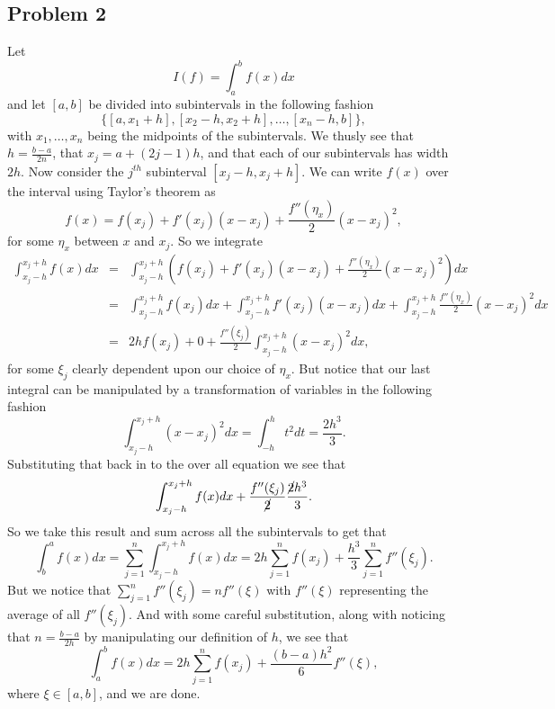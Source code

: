 \documentclass[12pt]{amsart}
\begin{document}
\begin{onehalfspace}
        \section{Problem 2}
        Let
        \[
            I(f) = \int_a^b f(x)dx
        \]
        and let $[a,b]$ be divided into subintervals in the following fashion
        \[
            \big\{[a,x_1+h],[x_2-h,x_2+h],\ldots,[x_n-h,b]\big\},
        \]
        with $x_1,\ldots,x_n$ being the midpoints of the subintervals.
        We thusly see that $h=\frac{b-a}{2n}$, that $x_j=a + (2j-1)h$, and that each of our subintervals has
        width $2h$.
        Now consider the $j^{th}$ subinterval $[x_j-h,x_j+h]$.
        We can write $f(x)$ over the interval using Taylor's theorem as
        \[
            f(x) = f(x_j) + f'(x_j)(x-x_j) + \frac{f''(\eta_x)}{2}(x-x_j)^2,
        \]
        for some $\eta_x$ between $x$ and $x_j$.
        So we integrate
        \begin{eqnarray*}
            \int_{x_j-h}^{x_j+h} f(x)dx & = & \int_{x_j-h}^{x_j+h}\left(f(x_j) + f'(x_j)(x-x_j) + \frac{f''(\eta_x)}{2}(x-x_j)^2 \right)dx\\
             & = & \int_{x_j-h}^{x_j+h}f(x_j)dx  + \int_{x_j-h}^{x_j+h}f'(x_j)(x-x_j)dx + \int_{x_j-h}^{x_j+h}\frac{f''(\eta_x)}{2}(x-x_j)^2 dx\\
             & = & 2hf(x_j) + 0 + \frac{f''(\xi_j)}{2}\int_{x_j-h}^{x_j+h} (x-x_j)^2 dx,
        \end{eqnarray*}
        for some $\xi_j$ clearly dependent upon our choice of $\eta_x$.
        But notice that our last integral can be manipulated by a transformation of variables in the following
        fashion
        \[
            \int_{x_j-h}^{x_j+h}(x-x_j)^2 dx = \int_{-h}^h t^2 dt = \frac{2h^3}{3}.
        \]
        Substituting that back in to the over all equation we see that
        \[
            \int_{x_j-h}^{x_j+h} f(x)dx + \frac{f''(\xi_j)}{\cancel{2}}\frac{\cancel{2}h^3}{3}.
        \]
        So we take this result and sum across all the subintervals to get that
        \[
            \int_b^a f(x)dx = \sum_{j=1}^n\int_{x_j-h}^{x_j+h}f(x)dx = 2h\sum_{j=1}^n f(x_j) + \frac{h^3}{3}\sum_{j=1}^n f''(\xi_j).
        \]
        But we notice that $\sum_{j=1}^n f''(\xi_j) = nf''(\xi)$ with $f''(\xi)$ representing the average of all $f''(\xi_j)$.
        And with some careful substitution, along with noticing that $n=\frac{b-a}{2h}$ by manipulating our definition of $h$,
        we see that
        \[
            \int_a^b f(x)dx = 2h\sum_{j=1}^n f(x_j) + \frac{(b-a)h^2}{6}f''(\xi),
        \]
        where $\xi\in[a,b]$, and we are done.


\end{onehalfspace}
\end{document}
